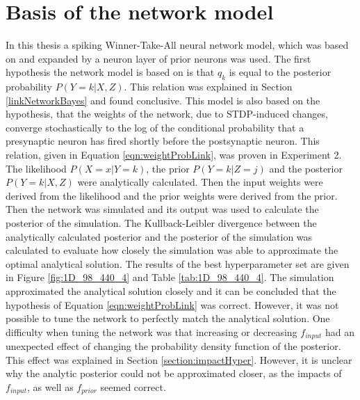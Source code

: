 \section{Basis of the network model}
\label{basisOfModel}
In this thesis a spiking Winner-Take-All neural network model, which was based on \citet{nessler} and expanded by a neuron layer of prior neurons was used. The first hypothesis the network model is based on is that $q_k$ is equal to the posterior probability $P(Y = k|X, Z)$. This relation was explained in Section \ref{linkNetworkBayes} and found conclusive. This model is also based on the hypothesis, that the weights of the network, due to STDP-induced changes, converge stochastically to the log of the conditional probability that a presynaptic neuron has fired shortly before the postsynaptic neuron. This relation, given in Equation \ref{eqn:weightProbLink}, was proven in Experiment 2. The likelihood $P(X=x|Y=k)$, the prior $P(Y=k|Z=j)$ and the posterior $P(Y = k|X, Z)$ were analytically calculated. Then the input weights were derived from the likelihood and the prior weights were derived from the prior. Then the network was simulated and its output was used to calculate the posterior of the simulation. The Kullback-Leibler divergence between the analytically calculated posterior and the posterior of the simulation was calculated to evaluate how closely the simulation was able to approximate the optimal analytical solution. The results of the best hyperparameter set are given in Figure \ref{fig:1D_98_440_4} and Table \ref{tab:1D_98_440_4}. The simulation approximated the analytical solution closely and it can be concluded that the hypothesis of Equation \ref{eqn:weightProbLink} was correct. However, it was not possible to tune the network to perfectly match the analytical solution. One difficulty when tuning the network was that increasing or decreasing $f_{input}$ had an unexpected effect of changing the probability density function of the posterior. This effect was explained in Section \ref{section:impactHyper}. However, it is unclear why the analytic posterior could not be approximated closer, as the impacts of $f_{input}$, as well as $f_{prior}$ seemed correct.


